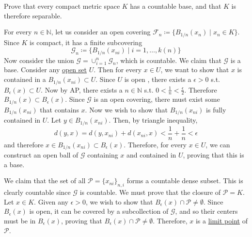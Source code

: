   \begin{exercise}[Rudin 2.25]
    Prove that every compact metric space $K$ has a countable base, and that $K$ is therefore separable. 
  \end{exercise}
  \begin{solution}
    For every $n \in \mathbb{N}$, let us consider an open covering $\mathscr{F}_n \coloneqq \{B_{1/n} (x_n) \mid x_n \in K\}$. Since $K$ is compact, it has a finite subcovering 
    \begin{equation}
      \mathscr{G}_n \coloneqq \{B_{1/n} (x_{ni}) \mid i = 1, \ldots, k(n)\}
    \end{equation}
    Now consider the union $\mathscr{G} = \cup_{i=1}^n \mathscr{G}_n$, which is countable. We claim that $\mathscr{G}$ is a base. Consider any \hyperref[pst-def:open-set]{open set} $U$. Then for every $x \in U$, we want to show that $x$ is contained in a $B_{1/n} (x_{ni}) \subset U$. Since $U$ is open , there exists a $\epsilon > 0$ s.t. $B_\epsilon (x) \subset U$. Now by AP, there exists a $n \in \mathbb{N}$ s.t. $0 < \frac{1}{n} < \frac{\epsilon}{2}$. Therefore $B_{1/n} (x) \subset B_{\epsilon} (x)$. Since $\mathscr{G}$ is an open covering, there must exist some $B_{1/n} (x_{ni})$ that contains $x$. Now we wish to show that $B_{1/n} (x_{ni})$ is fully contained in $U$. Let $y \in B_{1/n} (x_{ni})$. Then, by triangle inequality, 
    \begin{equation}
      d(y, x) = d(y, x_{ni}) + d(x_{ni}, x) < \frac{1}{n} + \frac{1}{n} < \epsilon
    \end{equation}
    and therefore $x \in B_{1/n} (x_{ni}) \subset B_{\epsilon} (x)$. Therefore, for every $x \in U$, we can construct an open ball of $\mathscr{G}$ containing $x$ and contained in $U$, proving that this is a base. 

    We claim that the set of all $\mathscr{P} = \{x_{ni}\}_{n, i}$ forms a countable dense subset. This is clearly countable since $\mathscr{G}$ is countable. We must prove that the closure of $\mathscr{P} = K$. Let $x \in K$. Given any $\epsilon > 0$, we wish to show that $B_{\epsilon} (x) \cap \mathscr{P} \neq \emptyset$. Since $B_\epsilon (x)$ is open, it can be covered by a subcollection of $\mathscr{G}$, and so their centers must be in $B_\epsilon (x)$, proving that $B_{\epsilon} (x) \cap \mathscr{P} \neq \emptyset$. Therefore, $x$ is a \hyperref[pst-def:limit-point]{limit point} of $\mathscr{P}$. 
  \end{solution}

  \begin{exercise}[Rudin 2.26]

  \end{exercise}
  \begin{solution}
    
  \end{solution}

